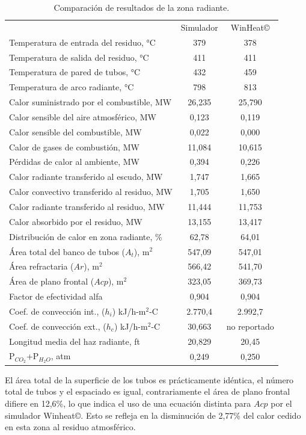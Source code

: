 \begin{table}[H] \begin{center}
\caption[Resultados en zona radiante]{Comparación de resultados de la zona radiante.}
\label{tbl:compara-zr} \begin{tabular}{l|c|c}
	& Simulador & WinHeat\copyright \\
Temperatura de entrada del residuo, °C	& 379 & 378	\\
Temperatura de salida del residuo, °C	& 411 & 411	\\
Temperatura de pared de tubos, °C	    & 432 & 459	\\
Temperatura de arco radiante, °C        & 798 & 813	\\
\hline
Calor suministrado por el combustible, MW	& 26,235 & 25,790	\\
Calor sensible del aire atmosférico, MW		& 0,123 & 0,119	\\
Calor sensible del combustible, MW			& 0,022 & 0,000	\\
\hline
Calor de gases de combustión, MW		    & 11,084 & 10,615	\\
Pérdidas de calor al ambiente, MW	        & 0,394 & 0,226	\\
Calor radiante transferido al escudo, MW	& 1,747 & 1,665	\\
Calor convectivo transferido al residuo, MW	& 1,705 & 1,650	\\
Calor radiante transferido al residuo, MW	& 11,444 & 11,753	\\
Calor absorbido por el residuo, MW	        & 13,155 & 13,417	\\
\hline
Distribución de calor en zona radiante, \%	& 62,78 & 64,01 \\
\hline
Área total del banco de tubos ($A_t$), m$^2$& 547,09 & 547,01 \\
Área refractaria ($Ar$), m$^2$		    & 566,42 & 541,70 \\
Área de plano frontal ($Acp$), m$^2$	& 323,05 & 369,73 \\
Factor de efectividad alfa			    & 0,904 & 0,904 \\
\hline
Coef. de convección int., ($h_i$) kJ/h-m$^2$-C	& 2.770,4 & 2.992,7 \\
Coef. de convección ext., ($h_c$) kJ/h-m$^2$-C	& 30,663 & no reportado \\
\hline
Longitud media del haz radiante, ft	& 20,829 & 20,45 \\
P$_{CO_2}$+P$_{H_2O}$, atm 		    & 0,249 & 0,250 \\
\end{tabular} \end{center} \end{table}
\par El área total de la superficie de los tubos es prácticamente idéntica, el número total de tubos y el espaciado es igual, contrariamente el área de plano frontal difiere en 12,6\%, lo que indica el uso de una ecuación distinta para $Acp$ por el simulador Winheat\copyright. Esto se refleja en la disminución de 2,77\% del calor cedido en esta zona al residuo atmosférico.

